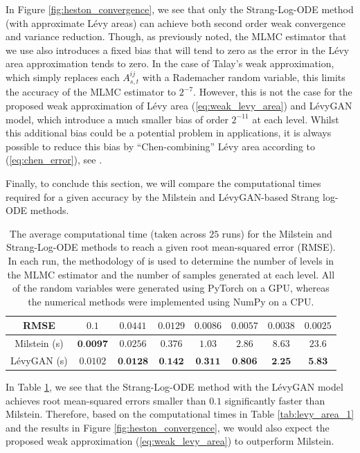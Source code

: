 \documentclass[sn-mathphys-num]{sn-jnl}%
\begin{document}
In Figure \ref{fig:heston_convergence}, we see that only the Strang-Log-ODE method (with approximate L\'{e}vy areas) can achieve both second order weak convergence and variance reduction.
Though, as previously noted, the MLMC estimator that we use also introduces a fixed bias that will tend to zero as the error in the L\'{e}vy area approximation tends to zero.
In the case of Talay's weak approximation, which simply replaces each $A_{s,t}^{ij}$ with a Rademacher random variable, this limits the accuracy of the MLMC estimator to $2^{-7}$.
However, this is not the case for the proposed weak approximation of L\'{e}vy area (\ref{eq:weak_levy_area}) and L\'{e}vyGAN model, which introduce a much smaller bias of order $2^{-11}$ at each level.
Whilst this additional bias could be a potential problem in applications, it is always possible to reduce this bias by ``Chen-combining'' L\'{e}vy area according to (\ref{eq:chen_error}), see \cite{jelincic2025levygan}.\medbreak

Finally, to conclude this section, we will compare the computational times required for a given accuracy by the Milstein and L\'{e}vyGAN-based Strang log-ODE methods.

\begin{table}[ht]
    \centering
    \begin{tabular}{@{}cccccccc@{}}
    \toprule
    RMSE & $0.1$  & $0.0441$ & $0.0129$  & $0.0086$ &$ 0.0057$& $0.0038$ &$ 0.0025$ \\ \midrule
   Milstein (s) &$ \textbf{0.0097}$& $0.0256$& $0.376$&$ 1.03$&$ 2.86$& $8.63$ & $23.6$ \\[2pt]
   L\'{e}vyGAN (s) & $0.0102$& $\textbf{0.0128}$& $\textbf{0.142}$& $\textbf{0.311}$&$ \textbf{0.806}$& $\textbf{2.25}$& $\textbf{5.83}$\\
     \bottomrule
    \end{tabular}\medbreak
    \caption{The average computational time (taken across $25$ runs) for the Milstein and Strang-Log-ODE methods to reach a given root mean-squared error (RMSE). In each run, the methodology of \cite[Section 5]{giles2008mlmc} is used to determine the number of levels in the MLMC estimator and the number of samples generated at each level. All of the random variables were generated using PyTorch on a GPU, whereas the numerical methods were implemented using NumPy on a CPU.}\label{tab:heston_times}
\end{table}\vspace{-4mm}

In Table \ref{tab:heston_times}, we see that the Strang-Log-ODE method with the L\'{e}vyGAN model achieves root mean-squared errors smaller than $0.1$ significantly faster than Milstein.
Therefore, based on the computational times in Table \ref{tab:levy_area_1} and the results in Figure \ref{fig:heston_convergence}, we would also expect the proposed weak approximation (\ref{eq:weak_levy_area}) to outperform Milstein.\medbreak
\end{document}
